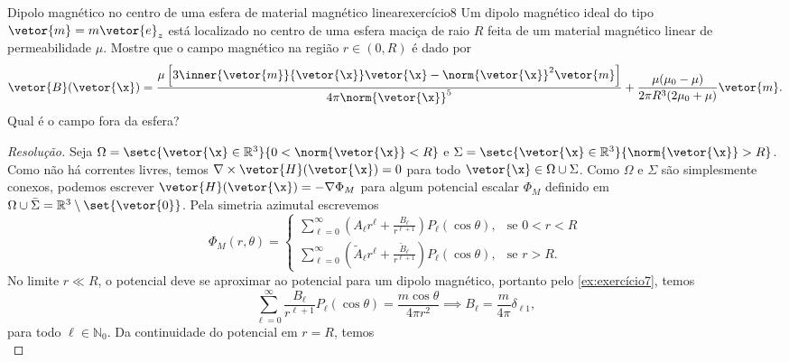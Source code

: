\begin{exercício}{Dipolo magnético no centro de uma esfera de material magnético linear}{exercício8}
    Um dipolo magnético ideal do tipo \(\vetor{m} = m\vetor{e}_z\) está localizado no centro de uma esfera maciça de raio \(R\) feita de um material magnético linear de permeabilidade \(\mu\). Mostre que o campo magnético na região \(r \in (0,R)\) é dado por
    \begin{equation*}
        \vetor{B}(\vetor{\x}) = \frac{\mu\left[3\inner{\vetor{m}}{\vetor{\x}}\vetor{\x} - \norm{\vetor{\x}}^2\vetor{m}\right]}{4\pi\norm{\vetor{\x}}^5} + \frac{\mu(\mu_0 - \mu)}{2\pi R^3(2\mu_0 + \mu)}\vetor{m}.
    \end{equation*}
    Qual é o campo fora da esfera?
\end{exercício}
\begin{proof}[Resolução]
    Seja \(\Omega = \setc{\vetor{\x} \in \mathbb{R}^3}{0 < \norm{\vetor{\x}} < R}\) e \(\Sigma = \setc{\vetor{\x}\in \mathbb{R}^3}{\norm{\vetor{\x}} > R}\). Como não há correntes livres, temos \(\nabla \times \vetor{H}(\vetor{\x}) = 0\) para todo \(\vetor{\x} \in \Omega \cup \Sigma\). Como \(\Omega\) e \(\Sigma\) são simplesmente conexos, podemos escrever \(\vetor{H}(\vetor{\x}) = - \nabla \Phi_M\) para algum potencial escalar \(\Phi_M\) definido em \(\Omega \cup \bar{\Sigma} = \mathbb{R}^3 \setminus \set{\vetor{0}}\). Pela simetria azimutal escrevemos
    \begin{equation*}
        \Phi_M(r, \theta) = \begin{cases}
            \displaystyle\sum_{\ell = 0}^\infty \left(A_\ell r^\ell + \frac{B_\ell}{r^{\ell + 1}}\right) P_\ell (\cos\theta),&\text{se }0 < r < R\\
            \displaystyle\sum_{\ell = 0}^\infty \left(\tilde{A}_\ell r^\ell + \frac{\tilde{B}_\ell}{r^{\ell + 1}}\right) P_\ell (\cos\theta),&\text{se }r  > R.
        \end{cases}
    \end{equation*}
    No limite \(r \ll R\), o potencial deve se aproximar ao potencial para um dipolo magnético, portanto pelo \cref{ex:exercício7}, temos
    \begin{equation*}
        \sum_{\ell = 0}^\infty \frac{B_\ell}{r^{\ell + 1}}P_\ell(\cos\theta) = \frac{m \cos\theta}{4\pi r^2} \implies  B_{\ell} = \frac{m}{4\pi} \delta_{\ell 1},
    \end{equation*}
    para todo \(\ell \in \mathbb{N}_0\). Da continuidade do potencial em \(r = R\), temos
    \begin{equation*}

\end{equation*}
\end{proof}
